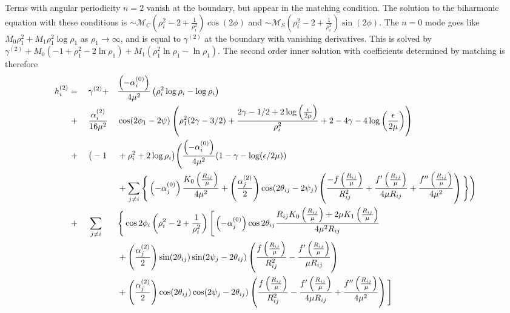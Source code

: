{Terms with angular periodicity $n=2$ vanish at the boundary, but appear in the matching condition. The solution to the biharmonic equation with these conditions is $\sim\mathcal{M}_C(\rho_i^2-2+\frac{1}{\rho_i^2})\cos(2\phi)$ and $\sim\mathcal{M}_S(\rho_i^2-2+\frac{1}{\rho_i^2})\sin(2\phi)$. The $n=0$ mode goes like $M_0\rho_1^2+M_1\rho_1^2\log\rho_1$ as $\rho_1 \rightarrow \infty$, and is equal to $\gamma^{(2)}$ at the boundary with vanishing derivatives. This is solved by $\gamma^{(2)} + M_0(-1+\rho_1^2-2\ln{\rho_1})+ M_1(\rho_1^2\ln{\rho_1}-\ln{\rho_1})$. The second order inner solution with coefficients determined by matching is therefore}
\begin{alignat}{3}
    h_i^{(2)} &=\;&& \gamma^{(2)} + && \frac{\left(-\alpha_{i}^{(0)}\right)}{4\mu^2}  \left(\rho_{i}^2\log \rho_{i} - \log \rho_{i}\right) \notag\\
    &\;+&&\frac{\alpha_i^{(2)}}{16\mu^2}&&\cos(2\phi_1-2\psi)\left(\rho_1^2(2\gamma - 3/2) + \frac{2\gamma - 1/2 + 2\log{\left(\frac{\epsilon}{2\mu}\right)}}{\rho_i^2} + 2 - 4\gamma - 4\log{\left(\frac{\epsilon}{2\mu}\right)}\right) \notag\\
    &\;+&& \big(-1 &&+ \rho_{i}^2 + 2\log\rho_{i}\big)\Bigg(\frac{\left(-\alpha_{i}^{(0)}\right)}{4\mu^2}(1-\gamma - \log (\epsilon/2\mu)) \notag\\
    & && &&+ \sum_{j \neq i}\Bigg\{\left(-\alpha_{j}^{(0)}\right)\frac{K_0\left(\frac{R_{ij}}{\mu}\right)}{{4\mu^2}}+\left(\frac{\alpha_{j}^{(2)}}{2}\right)\cos(2\theta_{ij}-2\psi_j)\left(\frac{-f\left(\frac{R_{ij}}{\mu}\right)}{R_{ij}^2}+\frac{f'\left(\frac{R_{ij}}{\mu}\right)}{4 \mu R_{ij}}+\frac{f''\left(\frac{R_{ij}}{\mu}\right)}{4 \mu^2}\right)\Bigg\}\Bigg) \notag\\
    &\;+&& \sum_{j \neq i}&& \Bigg\{\cos2\phi_i \left(\rho_i^2-2+\frac{1}{\rho_i^2}\right) \Bigg[\left(-\alpha_{j}^{(0)}\right)\cos2\theta_{ij}\frac{R_{ij}K_0\left(\frac{R_{ij}}{\mu}\right)+2\mu K_1\left(\frac{R_{ij}}{\mu}\right)}{{4\mu^2}R_{ij}} \notag\\
    & && &&+\left(\frac{\alpha_{j}^{(2)}}{2}\right)\sin(2\theta_{ij})\sin(2\psi_j-2\theta_{ij})\left(\frac{f\left(\frac{R_{ij}}{\mu}\right)}{R_{ij}^2}-\frac{f'\left(\frac{R_{ij}}{\mu}\right)}{\mu R_{ij}}\right) \notag\\
    & && &&+\left(\frac{\alpha_{j}^{(2)}}{2}\right)\cos(2\theta_{ij})\cos(2\psi_j-2\theta_{ij})\left(\frac{f\left(\frac{R_{ij}}{\mu}\right)}{R_{ij}^2}-\frac{f'\left(\frac{R_{ij}}{\mu}\right)}{4 \mu R_{ij}}+\frac{f''\left(\frac{R_{ij}}{\mu}\right)}{4 \mu^2}\right)\Bigg] \notag\\

\end{alignat}
